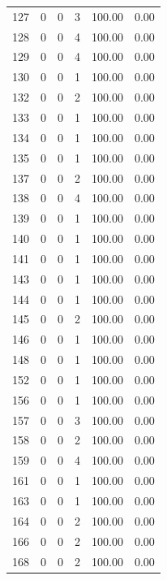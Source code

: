 \documentclass[11pt]{article}
\begin{document}
\begin{longtable}{r|r|r|r|r|r}
    127   & 0     & 0     & 3     & 100.00 & 0.00 \\
    128   & 0     & 0     & 4     & 100.00 & 0.00 \\
    129   & 0     & 0     & 4     & 100.00 & 0.00 \\
    130   & 0     & 0     & 1     & 100.00 & 0.00 \\
    132   & 0     & 0     & 2     & 100.00 & 0.00 \\
    133   & 0     & 0     & 1     & 100.00 & 0.00 \\
    134   & 0     & 0     & 1     & 100.00 & 0.00 \\
    135   & 0     & 0     & 1     & 100.00 & 0.00 \\
    137   & 0     & 0     & 2     & 100.00 & 0.00 \\
    138   & 0     & 0     & 4     & 100.00 & 0.00 \\
    139   & 0     & 0     & 1     & 100.00 & 0.00 \\
    140   & 0     & 0     & 1     & 100.00 & 0.00 \\
    141   & 0     & 0     & 1     & 100.00 & 0.00 \\
    143   & 0     & 0     & 1     & 100.00 & 0.00 \\
    144   & 0     & 0     & 1     & 100.00 & 0.00 \\
    145   & 0     & 0     & 2     & 100.00 & 0.00 \\
    146   & 0     & 0     & 1     & 100.00 & 0.00 \\
    148   & 0     & 0     & 1     & 100.00 & 0.00 \\
    152   & 0     & 0     & 1     & 100.00 & 0.00 \\
    156   & 0     & 0     & 1     & 100.00 & 0.00 \\
    157   & 0     & 0     & 3     & 100.00 & 0.00 \\
    158   & 0     & 0     & 2     & 100.00 & 0.00 \\
    159   & 0     & 0     & 4     & 100.00 & 0.00 \\
    161   & 0     & 0     & 1     & 100.00 & 0.00 \\
    163   & 0     & 0     & 1     & 100.00 & 0.00 \\
    164   & 0     & 0     & 2     & 100.00 & 0.00 \\
    166   & 0     & 0     & 2     & 100.00 & 0.00 \\
    168   & 0     & 0     & 2     & 100.00 & 0.00 \\

\end{longtable}
\end{document}
